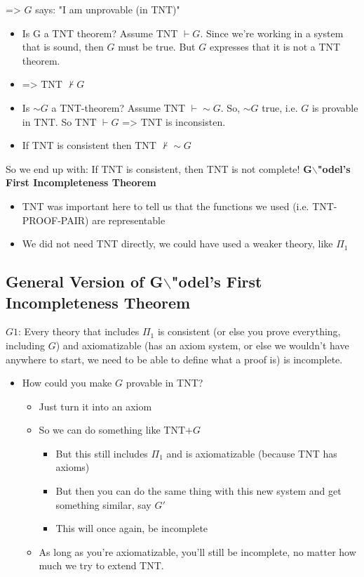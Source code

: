 \documentclass[11pt]{article}
\begin{document}
=> \(G\) says: "I am unprovable (in TNT)"
\begin{itemize}
\item Is G a TNT theorem? Assume TNT \(\vdash G\). Since we're working in a system that is sound, then \(G\) must be true. But \(G\) expresses that it is not a TNT theorem. \lightning
\item => TNT \(\nvdash G\)
\item Is \(\sim G\) a TNT-theorem? Assume TNT \(\vdash \sim G\). So, \(\sim G\) true, i.e. \(G\) is provable in TNT. So TNT \(\vdash G\) => TNT is inconsisten.
\item If TNT is consistent then TNT \(\nvdash \sim G\)
\end{itemize}
So we end up with: If TNT is consistent, then TNT is not complete! \textbf{G$\backslash$"odel's First Incompleteness Theorem}
\begin{itemize}
\item TNT was important here to tell us that the functions we used (i.e. TNT-PROOF-PAIR) are representable
\item We did not need TNT directly, we could have used a weaker theory, like \(\Pi_1\)
\end{itemize}
\subsection{General Version of G$\backslash$"odel's First Incompleteness Theorem}
\label{sec:orge6225f0}
\(G1\): Every theory that includes \(\Pi_1\) is consistent (or else you prove everything, including \(G\)) and axiomatizable (has an axiom system, or else we wouldn't have anywhere to start, we need to be able to define what a proof is) is incomplete.
\begin{itemize}
\item How could you make \(G\) provable in TNT?
\begin{itemize}
\item Just turn it into an axiom
\item So we can do something like TNT\(+G\)
\begin{itemize}
\item But this still includes \(\Pi_1\) and is axiomatizable (because TNT has axioms)
\item But then you can do the same thing with this new system and get something similar, say \(G'\)
\item This will once again, be incomplete
\end{itemize}
\item As long as you're axiomatizable, you'll still be incomplete, no matter how much we try to extend TNT.
\end{itemize}
\end{itemize}
\end{document}
